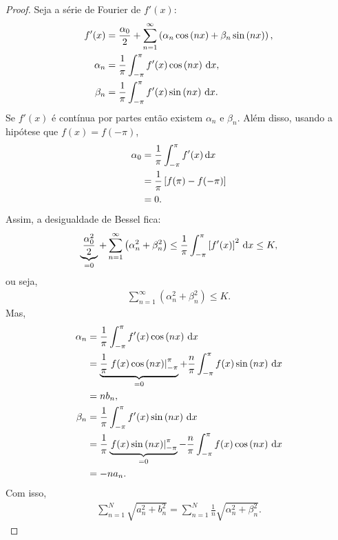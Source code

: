 \begin{proof}
    Seja a s\'{e}rie de Fourier de $f'(x)$:
    \begin{align*}
        f'(x) &= \frac{\alpha_0}{2} + \sum_{n = 1}^\infty \left( \alpha_n \cos\left( n x \right) + \beta_n \sin\left( n x \right) \right), \\
        \alpha_n &= \frac{1}{\pi} \int_{-\pi}^\pi f'(x) \cos\left( n x \right) \, \mathrm{d}x, \\
        \beta_n &= \frac{1}{\pi} \int_{-\pi}^\pi f'(x) \sin\left( n x \right) \, \mathrm{d}x.
    \end{align*}
    Se $f'(x)$ \'{e} cont\'{i}nua por partes ent\~{a}o existem $\alpha_n$ e $\beta_n$. Al\'{e}m disso, usando a hip\'{o}tese que $f(x) = f(-\pi)$,
    \begin{align*}
        \alpha_0 &= \frac{1}{\pi} \int_{-\pi}^\pi f'(x) \, \mathrm{d}x \\
        &= \frac{1}{\pi} \left[ f(\pi) - f(-\pi) \right] \\
        &= 0.
    \end{align*}
    Assim, a desigualdade de Bessel fica:
    \begin{align*}
        \underbrace{\frac{\alpha_0^2}{2}}_{=0} + \sum_{n = 1}^\infty \left( \alpha_n^2 + \beta_n^2 \right) \leq \frac{1}{\pi} \int_{-\pi}^\pi \left[ f'(x) \right]^2 \, \mathrm{d}x \leq K,
    \end{align*}
    ou seja,
    \begin{align*}
        \sum_{n = 1}^\infty \left( \alpha_n^2 + \beta_n^2 \right) \leq K.
    \end{align*}
    Mas,
    \begin{align*}
        \alpha_n &= \frac{1}{\pi} \int_{-\pi}^\pi f'(x) \cos\left( n x \right) \, \mathrm{d}x \\
        &= \underbrace{\frac{1}{\pi} \left. f(x) \cos\left( n x \right) \right|_{-\pi}^\pi}_{= 0} + \frac{n}{\pi} \int_{-\pi}^\pi f(x) \sin\left( n x \right) \, \mathrm{d}x \\
        &= n b_n, \\
        \beta_n &= \frac{1}{\pi} \int_{-\pi}^\pi f'(x) \sin\left( n x \right) \, \mathrm{d}x \\
        &= \frac{1}{\pi} \underbrace{\left. f(x) \sin\left( n x \right) \right|_{-\pi}^\pi}_{= 0} - \frac{n}{\pi} \int_{-\pi}^\pi f(x) \cos\left( n x \right) \, \mathrm{d}x \\
        &= - n a_n.
    \end{align*}
    Com isso,
    \begin{align*}
        \sum_{n = 1}^N \sqrt{a_n^2 + b_n^2} = \sum_{n = 1}^N \frac{1}{n} \sqrt{\alpha_n^2 + \beta_n^2}.

\end{align*}
\end{proof}
